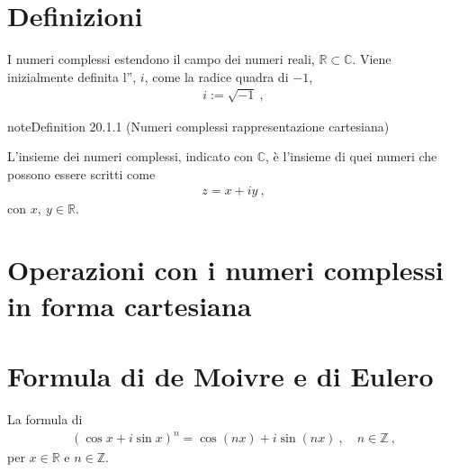 \documentclass[letterpaper,10pt,italian]{jupyterBook}
\begin{document}
\section{Definizioni}
\label{\detokenize{ch/algebra/complex-algebra:definizioni}}\label{\detokenize{ch/algebra/complex-algebra:math-hs-algebra-complex-def}}
\sphinxAtStartPar
I numeri complessi estendono il campo dei numeri reali, \(\mathbb{R} \subset \mathbb{C}\). Viene inizialmente definita l”, \(i\), come la radice quadra di \(-1\),
\begin{equation*}
\begin{split}i := \sqrt{-1} \ ,\end{split}
\end{equation*}
\sphinxAtStartPar
{}  
\label{ch/algebra/complex-algebra:definition-0}
\begin{sphinxadmonition}{note}{Definition 20.1.1 (Numeri complessi \sphinxhyphen{} rappresentazione cartesiana)}



\sphinxAtStartPar
L’insieme dei numeri complessi, indicato con \(\mathbb{C}\), è l’insieme di quei numeri che possono essere scritti come
\begin{equation*}
\begin{split}z = x + i y \ ,\end{split}
\end{equation*}
\sphinxAtStartPar
con \(x, \ y \in \mathbb{R}\).
\end{sphinxadmonition}


\section{Operazioni con i numeri complessi \sphinxhyphen{} in forma cartesiana}
\label{\detokenize{ch/algebra/complex-algebra:operazioni-con-i-numeri-complessi-in-forma-cartesiana}}\label{\detokenize{ch/algebra/complex-algebra:math-hs-algebra-complex-operations-0}}

\section{Formula di de Moivre e di Eulero}
\label{\detokenize{ch/algebra/complex-algebra:formula-di-de-moivre-e-di-eulero}}\label{\detokenize{ch/algebra/complex-algebra:math-hs-algebra-complex-demoivre-euler}}
\sphinxAtStartPar
La formula di 
\begin{equation*}
\begin{split}(\cos x + i \sin x)^n = \cos(nx) + i \sin(nx) \ , \quad n \in \mathbb{Z} \ ,\end{split}
\end{equation*}
\sphinxAtStartPar
per \(x \in \mathbb{R}\) e \(n \in \mathbb{Z}\).
\end{document}
